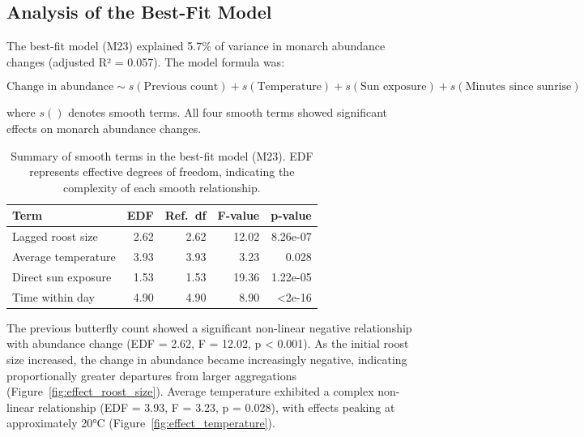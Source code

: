 \subsection{Analysis of the Best-Fit Model}

The best-fit model (M23) explained 5.7\% of variance in monarch abundance changes (adjusted R² = 0.057). The model formula was:

\begin{equation}
\text{Change in abundance} \sim s(\text{Previous count}) + s(\text{Temperature}) + s(\text{Sun exposure}) + s(\text{Minutes since sunrise})
\end{equation}

where $s()$ denotes smooth terms. All four smooth terms showed significant effects on monarch abundance changes.

\begin{table}[htbp]
\centering
\caption{Summary of smooth terms in the best-fit model (M23). EDF represents effective degrees of freedom, indicating the complexity of each smooth relationship.}\label{tab:smooth_terms}
\begin{tabular}{lrrrr}
\hline
Term & EDF & Ref.~df & F-value & p-value \\
\hline
Lagged roost size & 2.62 & 2.62 & 12.02 & 8.26e-07 \\
Average temperature & 3.93 & 3.93 & 3.23 & 0.028 \\
Direct sun exposure & 1.53 & 1.53 & 19.36 & 1.22e-05 \\
Time within day & 4.90 & 4.90 & 8.90 & <2e-16 \\
\hline
\end{tabular}
\end{table}

The previous butterfly count showed a significant non-linear negative relationship with abundance change (EDF = 2.62, F = 12.02, p < 0.001). As the initial roost size increased, the change in abundance became increasingly negative, indicating proportionally greater departures from larger aggregations (Figure~\ref{fig:effect_roost_size}). Average temperature exhibited a complex non-linear relationship (EDF = 3.93, F = 3.23, p = 0.028), with effects peaking at approximately 20°C (Figure~\ref{fig:effect_temperature}).

